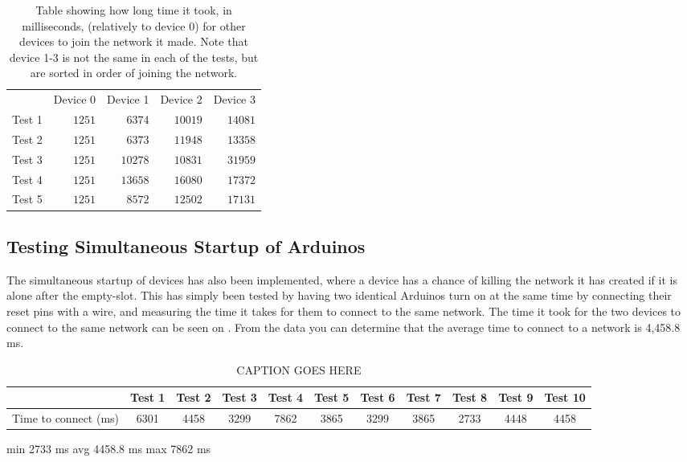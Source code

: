 \begin{table}[ht]
\centering
\begin{tabular}{lllll}
                            & Device 0                  & Device 1                   & Device 2                   & Device 3                   \\ \cline{2-5} 
\multicolumn{1}{r|}{Test 1} & \multicolumn{1}{r|}{$1251$} & \multicolumn{1}{r|}{$6374$}  & \multicolumn{1}{r|}{$10019$} & \multicolumn{1}{r|}{$14081$} \\ \cline{2-5} 
\multicolumn{1}{r|}{Test 2} & \multicolumn{1}{r|}{$1251$} & \multicolumn{1}{r|}{$6373$}  & \multicolumn{1}{r|}{$11948$} & \multicolumn{1}{r|}{$13358$} \\ \cline{2-5} 
\multicolumn{1}{r|}{Test 3} & \multicolumn{1}{r|}{$1251$} & \multicolumn{1}{r|}{$10278$} & \multicolumn{1}{r|}{$10831$} & \multicolumn{1}{r|}{$31959$} \\ \cline{2-5} 
\multicolumn{1}{r|}{Test 4} & \multicolumn{1}{r|}{$1251$} & \multicolumn{1}{r|}{$13658$} & \multicolumn{1}{r|}{$16080$} & \multicolumn{1}{r|}{$17372$} \\ \cline{2-5} 
\multicolumn{1}{r|}{Test 5} & \multicolumn{1}{r|}{$1251$} & \multicolumn{1}{r|}{$8572$}  & \multicolumn{1}{r|}{$12502$} & \multicolumn{1}{r|}{$17131$} \\ \cline{2-5} 
\end{tabular}
\caption{Table showing how long time it took, in milliseconds, (relatively to device 0) for other devices to join the network it made. Note that device 1-3 is not the same in each of the tests, but are sorted in order of joining the network.}
\label{tab:ccrc_test}
\end{table}

\subsection{Testing Simultaneous Startup of Arduinos}
The simultaneous startup of devices has also been implemented, where a device has a chance of killing the network it has created if it is alone after the empty-slot.
This has simply been tested by having two identical Arduinos turn on at the same time by connecting their reset pins with a wire, and measuring the time it takes for them to connect to the same network.
The time it took for the two devices to connect to the same network can be seen on .
From the data you can determine that the average time to connect to a network is 4,458.8 ms. 

\begin{table}[ht]
\centering\scriptsize
\begin{tabularx}{\textwidth}{X|c c c c c c c c c c}
                          & Test 1 & Test 2 & Test 3 & Test 4 & Test 5 & Test 6 & Test 7 & Test 8 & Test 9 & Test 10\\
                          \midrule
    Time to connect (ms)  & 6301   & 4458   & 3299   & 7862   & 3865   & 3299   & 3865   & 2733   & 4448   & 4458
\end{tabularx}
\caption{CAPTION GOES HERE}
\label{graphConnectime}
\end{table}


min 2733 ms
avg 4458.8 ms
max 7862 ms